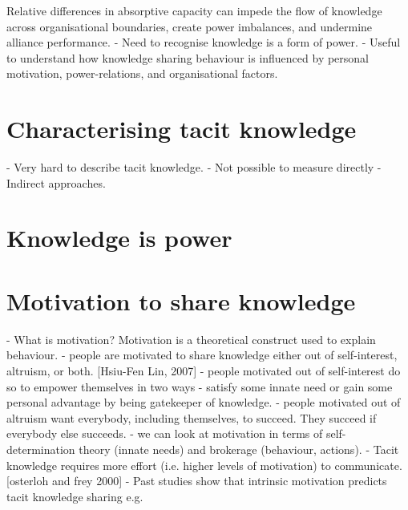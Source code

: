 



 


Relative differences in absorptive capacity can impede the flow of knowledge across organisational boundaries, create power imbalances, and undermine alliance performance.  
- Need to recognise knowledge is a form of power.
- Useful to understand how knowledge sharing behaviour is influenced by personal motivation, power-relations, and organisational factors.
 
\section{Characterising tacit knowledge} 

- Very hard to describe tacit knowledge. 
- Not possible to measure directly
- Indirect approaches.

\section{Knowledge is power}

 
\section{Motivation to share knowledge}
 
- What is motivation? Motivation is a theoretical construct used to explain behaviour.
- people are motivated to share knowledge either out of self-interest, altruism, or both. [Hsiu-Fen Lin, 2007]
- people motivated out of self-interest do so to empower themselves in two ways - satisfy some innate need or gain some personal advantage by being gatekeeper of knowledge.
- people motivated out of altruism want everybody, including themselves, to succeed. They succeed if everybody else succeeds.
- we can look at motivation in terms of self-determination theory (innate needs) and brokerage (behaviour, actions).
- Tacit knowledge requires more effort (i.e. higher levels of motivation) to communicate.  [osterloh and frey 2000]
- Past studies show that intrinsic motivation predicts tacit knowledge sharing e.g.
 
